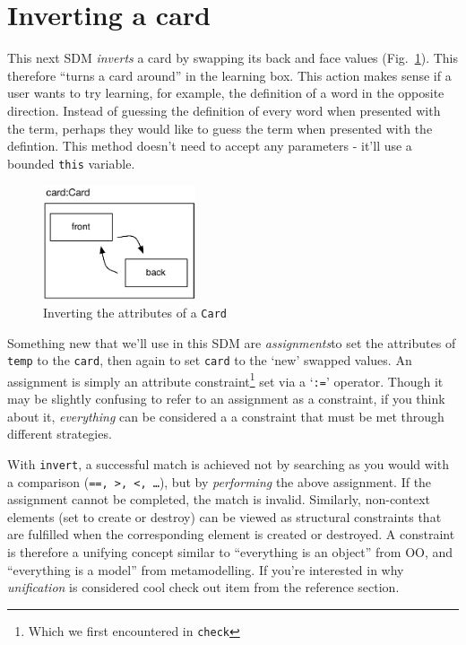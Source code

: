 \newpage
\hypertarget{sec:invertCard}{}
\section{Inverting a card}
\genHeader

This next SDM \emph{inverts} a card by swapping its back and face values (Fig.~\ref{fig:goal_invert}). This therefore ``turns a card around'' in the learning
box. This action makes sense if a user wants to try learning, for example, the definition of a word in the opposite direction. Instead of guessing the
definition of every word when presented with the term, perhaps they would like to guess the term when presented with the defintion. This method doesn't need to
accept any parameters - it'll use a bounded \texttt{this} variable.

\vspace{0.5cm}

\begin{figure}[htbp]
	\centering
    \includegraphics[width=0.4\textwidth]{goal_invert.pdf}
 	\caption{Inverting the attributes of a \texttt{Card}}
 	\label{fig:goal_invert}
\end{figure}
\FloatBarrier

Something new that we'll use in this SDM are \emph{assignments}to set the attributes of \texttt{temp} to the \texttt{card}, then again to
set \texttt{card} to the `new' swapped values. An assignment is simply an attribute constraint\footnote{Which we first encountered in \texttt{check}} set via a
`\texttt{:=}' operator. Though it may be slightly confusing to refer to an assignment as a constraint, if you think about it, \emph{everything} can be
considered a a constraint that must be met through different strategies.

With \texttt{invert}, a successful match is achieved not by searching as you would with a comparison (\texttt{==, >, <, \ldots}), but by \emph{performing} the
above assignment. If the assignment cannot be completed, the match is invalid. Similarly, non-context elements (set to create or destroy) can be viewed as
structural constraints that are fulfilled when the corresponding element is created or destroyed.  A constraint is therefore a unifying concept similar to
``everything is an object'' from OO, and ``everything is a model'' from metamodelling.  If you're interested in why \emph{unification} is considered cool check
out item \cite{BEZ05} from the reference section.








